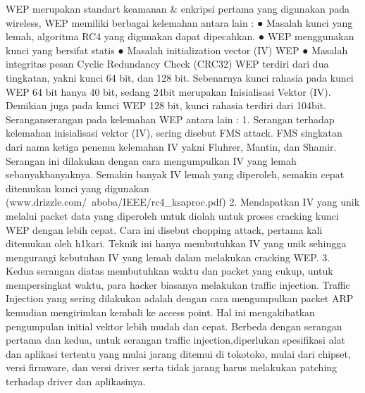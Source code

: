 WEP merupakan standart keamanan & enkripsi pertama yang digunakan pada wireless, WEP memiliki
berbagai kelemahan antara lain :
● Masalah kunci yang lemah, algoritma RC4 yang digunakan dapat dipecahkan.
● WEP menggunakan kunci yang bersifat statis
● Masalah initialization vector (IV) WEP
● Masalah integritas pesan Cyclic Redundancy Check (CRC32)
WEP terdiri dari dua tingkatan, yakni kunci 64 bit, dan 128 bit. Sebenarnya kunci rahasia pada kunci
WEP 64 bit hanya 40 bit, sedang 24bit merupakan Inisialisasi Vektor (IV). Demikian juga pada kunci
WEP 128 bit, kunci rahasia terdiri dari 104bit. Seranganserangan
pada kelemahan WEP antara lain :
1. Serangan terhadap kelemahan inisialisasi vektor (IV), sering disebut FMS attack. FMS singkatan
dari nama ketiga penemu kelemahan IV yakni Fluhrer, Mantin, dan Shamir. Serangan ini
dilakukan dengan cara mengumpulkan IV yang lemah sebanyakbanyaknya.
Semakin banyak IV
lemah yang diperoleh, semakin cepat ditemukan kunci yang digunakan
(www.drizzle.com/~aboba/IEEE/rc4_ksaproc.pdf)
2. Mendapatkan IV yang unik melalui packet data yang diperoleh untuk diolah untuk proses
cracking kunci WEP dengan lebih cepat. Cara ini disebut chopping attack, pertama kali
ditemukan oleh h1kari. Teknik ini hanya membutuhkan IV yang unik sehingga mengurangi
kebutuhan IV yang lemah dalam melakukan cracking WEP.
3. Kedua serangan diatas membutuhkan waktu dan packet yang cukup, untuk mempersingkat waktu,
para hacker biasanya melakukan traffic injection. Traffic Injection yang sering dilakukan adalah
dengan cara mengumpulkan packet ARP kemudian mengirimkan kembali ke access point. Hal ini
mengakibatkan pengumpulan initial vektor lebih mudah dan cepat. Berbeda dengan serangan
pertama dan kedua, untuk serangan traffic injection,diperlukan spesifikasi alat dan aplikasi
tertentu yang mulai jarang ditemui di tokotoko,
mulai dari chipset, versi firmware, dan versi
driver serta tidak jarang harus melakukan patching terhadap driver dan aplikasinya.
